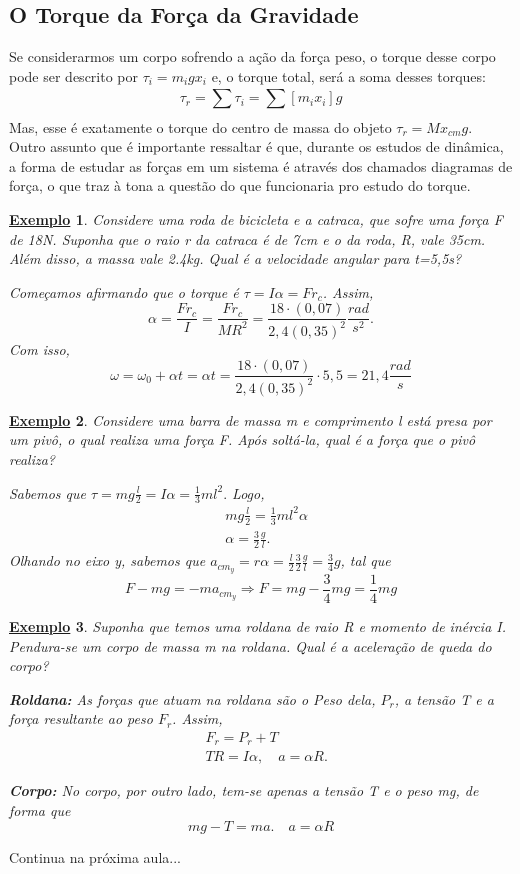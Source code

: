 \documentclass{article}
\newtheorem{example}{\underline{Exemplo}}
\begin{document}
\subsection{O Torque da Força da Gravidade}
Se considerarmos um corpo sofrendo a ação da força peso, o torque desse corpo pode ser descrito por
\(\tau_{i} = m_{i}gx_{i}\) e, o torque total, será a soma desses torques: 
\[
  \tau_{r} = \sum\limits_{}^{}\tau_{i} = \sum\limits_{}^{}[m_{i}x_{i}]g
\]
Mas, esse é exatamente o torque do centro de massa do objeto \(\tau_{r} = Mx_{cm}g\). Outro assunto que é
importante ressaltar é que, durante os estudos de dinâmica, a forma de estudar as forças em um sistema é através
dos chamados diagramas de força, o que traz à tona a questão do que funcionaria pro estudo do torque.
\begin{example}
  Considere uma roda de bicicleta e a catraca, que sofre uma força F de 18N. Suponha que o raio r
  da catraca é de 7cm e o da roda, R, vale 35cm. Além disso, a massa vale 2.4kg. Qual é a velocidade angular para t=5,5s?

  Começamos afirmando que o torque é \(\tau = I\alpha = Fr_{c}\). Assim, 
  \[
    \alpha = \frac{Fr_{c}}{I} = \frac{Fr_{c}}{MR^{2}} = \frac{18 \cdot (0,07)}{2,4(0,35)^{2}}\frac{rad}{s^{2}}.
  \]
  Com isso, 
  \[
    \omega = \omega_{0} + \alpha t = \alpha t = \frac{18 \cdot (0,07)}{2,4(0,35)^{2}} \cdot 5,5 = 21,4 \frac{rad}{s}
  \]
\end{example}
\begin{example}
  Considere uma barra de massa m e comprimento l está presa por um pivô, o qual realiza uma força F. Após soltá-la, qual é a força que o pivô realiza?

  Sabemos que \(\tau = mg \frac{l}{2} = I\alpha = \frac{1}{3}ml^{2}.\) Logo, 
  \begin{align*}
   &mg \frac{l}{2} = \frac{1}{3}ml^{2}\alpha \\
   &\alpha = \frac{3}{2}\frac{g}{l}.
  \end{align*}
  Olhando no eixo y, sabemos que \(a_{cm_{y}} = r\alpha  = \frac{l}{2}\frac{3}{2}\frac{g}{l} = \frac{3}{4}g\), tal que 
  \[
    F - mg = -ma_{cm_y} \Rightarrow F = mg - \frac{3}{4}mg = \frac{1}{4}mg
  \]
\end{example}
\begin{example}
  Suponha que temos uma roldana de raio R e momento de inércia I. Pendura-se um corpo de massa m na roldana. Qual é a aceleração de queda do corpo?

  \textbf{Roldana:}
  As forças que atuam na roldana são o Peso dela, \(P_{r}\), a tensão T
  e a força resultante ao peso \(F_{r}\). Assim, 
  \begin{align*}
  &F_{r} = P_{r} + T\\
  &TR = I\alpha,\quad a = \alpha R. 
  \end{align*}

  \textbf{Corpo:}
  No corpo, por outro lado, tem-se apenas a tensão T e o peso mg, de forma que 
  \[
    mg-T = ma.\quad a = \alpha R
  \]
\end{example}
Continua na próxima aula...
\newpage
\end{document}
